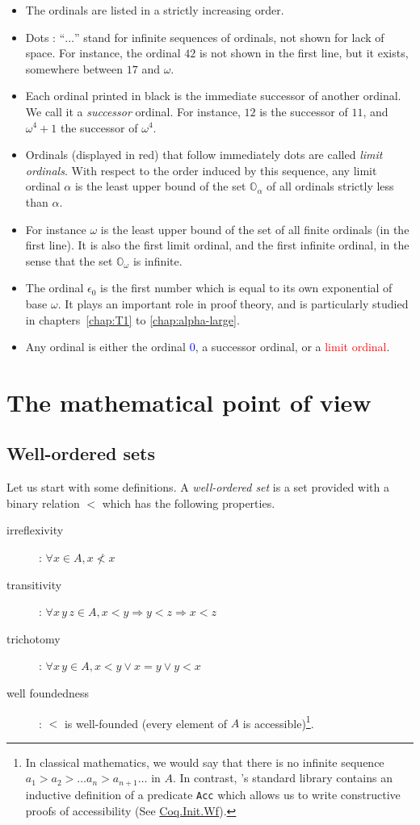 \begin{itemize}
\item The ordinals are listed in a strictly increasing order. 
\item Dots : ``$\ldots$'' stand for  infinite sequences of ordinals, not shown for lack of space. For instance, the ordinal $42$ is not shown in the first line, but it exists, somewhere between $17$ and $\omega$.
\item Each ordinal printed in black is the immediate successor of another ordinal. We call it a \emph{successor} ordinal. For instance, $12$ is the successor of $11$, and $\omega^4+1$ the successor of $\omega^4$.
\item Ordinals (displayed in red)  that  follow immediately dots are called \emph{limit ordinals}. With respect to the order induced by this sequence, any limit ordinal $\alpha$ is the least upper bound of  the set $\mathbb{O}_\alpha$ of all ordinals strictly less than $\alpha$.
\item
For instance $\omega$ is the least upper bound of the set of all finite ordinals (in the first line). It is also the first limit ordinal, and the first infinite ordinal, in the sense that 
the set $\mathbb{O}_\omega$ is infinite.
\item The ordinal $\epsilon_0$ is the first number which is equal to its own exponential of base $\omega$. It plays an important role in proof theory, and is particularly studied in chapters~\ref{chap:T1} to \ref{chap:alpha-large}.
\item Any ordinal is  either the ordinal \textcolor{blue}{$0$},
a successor ordinal, or a \textcolor{red}{limit ordinal}.
\end{itemize}




\section{The mathematical point of view}

\subsection{Well-ordered sets}
Let us start with some definitions.
A  \emph{well-ordered set} is a set provided with a binary relation $<$ which has the following properties.
\begin{description}
\item[irreflexivity] : $\forall x\in A, x\not< x$
\item[transitivity] : $\forall x\,y\,z\in A, x<y \Rightarrow y<z \Rightarrow x<z$
\item[trichotomy]: $\forall x\,y\in A, x<y \vee x = y \vee y < x$
\item[well foundedness]: $<$ is well-founded (every element of $A$ is accessible)\footnote{In classical mathematics, we would say that there is no infinite sequence $a_1>a_2> \dots a_n> a_{n+1}\dots$ in $A$. In contrast, \coq's standard library contains
an inductive definition of a predicate \texttt{Acc} which allows us to write 
constructive proofs of accessibility (See \href{https://coq.inria.fr/distrib/current/stdlib/Coq.Init.Wf.html}{Coq.Init.Wf}).}.
\end{description}

